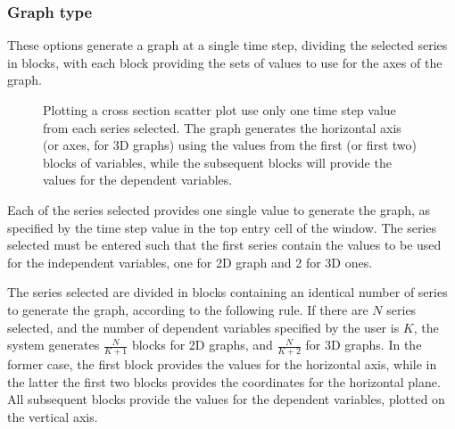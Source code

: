 \documentclass [11pt,a4paper] {book}
\begin{document}
\subsubsection{Graph type }

These options generate a graph at a single time step, dividing the selected series in blocks, with each block providing the sets of values to use for the axes of the graph.

\begin{figure}[ht]
  \centering
  \caption{\small Plotting a cross section scatter plot use only one time step value from each series selected. The graph generates the horizontal axis (or axes, for 3D graphs) using the values from the first (or first two) blocks of variables, while the subsequent blocks will provide the values for the dependent variables.}
  \label{fig:cs_xy}
\end{figure}

Each of the series selected provides one single value to generate the graph, as specified by the time step value in the top entry cell of the window. The series selected must be entered such that the first series contain the values to be used for the independent variables, one for 2D graph and 2 for 3D ones. 

The series selected are divided in blocks containing an identical number of series to generate the graph, according to the following rule. If there are $N$ series selected, and the number of dependent variables specified by the user is $K$, the system generates $\frac{N}{K+1}$ blocks for 2D graphs, and $\frac{N}{K+2}$ for 3D graphs. In the former case, the first block provides the values for the horizontal axis, while in the latter the first two blocks provides the coordinates for the horizontal plane. All subsequent blocks provide the values for the dependent variables, plotted on the vertical axis.
\end{document}
